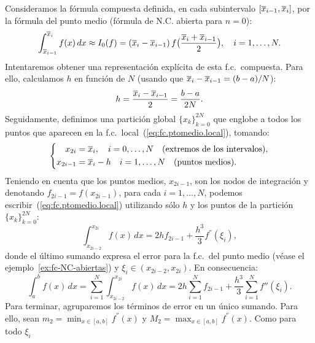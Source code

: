 \begin{example}
  \label{ex:fc.compuesta.ptomedio}
  Consideramos la fórmula compuesta definida, en cada subintervalo
  $[\overline x_{i-1},\overline x_i]$, por la fórmula del punto medio (fórmula de
  N.C. abierta para $n=0$):
  \begin{equation}
    \label{eq:fc.ptomedio.local}
    \int_{\overline x_{i-1}}^{\overline x_{i}} f(x)\, dx \approx I_0(f)=
    (\overline x_{i}-\overline x_{i-1}) \, f\big(\frac{\overline x_{i}+\overline x_{i-1}} 2 \big), \quad i=1,\dots,N.
  \end{equation}
  Intentaremos obtener una representación explícita de esta f.c.\
  compuesta. Para ello, calculamos $h$ en función de $N$ (usando que
  $\overline x_{i}-\overline x_{i-1} = (b-a)/N$):
  $$
  h= \frac{\overline x_{i}-\overline x_{i-1}}2 = \frac{b-a}{2N}.
  $$
  Seguidamente, definimos una partición global $\{x_k\}_{k=0}^{2N}$
  que englobe a todos los puntos que aparecen en la f.c.\
  local~(\ref{eq:fc.ptomedio.local}), tomando:
  \begin{equation*}
    \left\{
      \begin{aligned}
        x_{2i} &= \overline x_i, \quad i=0,\dots,N \quad \text{(extremos de los
          intervalos)},
        \\
        x_{2i-1} &= \overline x_i-h \quad i=1,\dots,N
        \quad\text{(puntos medios)}.
      \end{aligned}
      \right.
    \end{equation*}
    Teniendo en cuenta que los puntos medios, $x_{2i-1}$, son los
    nodos de integración y denotando $f_{2i-1}=f(x_{2i-1})$, para cada
    $i=1,\dots,N$, podemos escribir~(\ref{eq:fc.ptomedio.local})
    utilizando sólo $h$ y los puntos de la partición
    $\{x_k\}_{k=0}^{2N}$:
  \begin{equation*}
    \int_{x_{2i-2}}^{x_{2i}} f(x)\, dx =
    2hf_{2i-1} +
    \frac{h^3}{3}f^{''}(\xi_i),
  \end{equation*}
  donde el último sumando expresa el error para la f.c.\ del punto
  medio (véase el ejemplo~\ref{ex:fc-NC-abiertas}) y
  $\xi_i\in(x_{2i-2},x_{2i})$. En consecuencia:
  \begin{equation}
   \label{eq:2}
    \int_a^b f(x)\,dx = \sum_{i=1}^{N} \int_{x_{2i-2}}^{x_{2i}} f(x)\,dx
    = 2h \sum_{i=1}^{N} f_{2i-1} + \frac{h^3}{3} \sum_{i=1}^{N}f''(\xi_i).
  \end{equation}
  Para terminar, agruparemos los términos de error en un único
  sumando. Para ello, sean $m_2=\min_{x\in[a,b]} f^{''}(x)$ y
  $M_2=\max_{x\in[a,b]} f^{''}(x)$. Como para todo $\xi_i$

\end{example}
